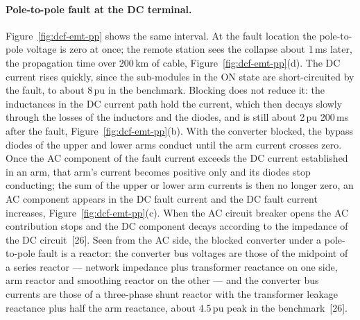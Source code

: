 \paragraph{Pole-to-pole fault at the DC terminal.}
Figure~\ref{fig:dcf-emt-pp} shows the same interval. At the fault location
the pole-to-pole voltage is zero at once; the remote station sees the
collapse about 1\,ms later, the propagation time over 200\,km of cable,
Figure~\ref{fig:dcf-emt-pp}(d). The DC current rises quickly, since the
sub-modules in the ON state are short-circuited by the fault, to about
8\,pu in the benchmark. Blocking does not reduce it: the inductances in the
DC current path hold the current, which then decays slowly through the
losses of the inductors and the diodes, and is still about 2\,pu 200\,ms
after the fault, Figure~\ref{fig:dcf-emt-pp}(b). With the converter blocked,
the bypass diodes of the upper and lower arms conduct until the arm current
crosses zero. Once the AC component of the fault current exceeds the DC
current established in an arm, that arm's current becomes positive only and
its diodes stop conducting; the sum of the upper or lower arm currents is
then no longer zero, an AC component appears in the DC fault current and the
DC fault current increases, Figure~\ref{fig:dcf-emt-pp}(c). When the AC
circuit breaker opens the AC contribution stops and the DC component decays
according to the impedance of the DC circuit~[26]. Seen from the AC side,
the blocked converter under a pole-to-pole fault is a reactor: the converter
bus voltages are those of the midpoint of a series reactor --- network
impedance plus transformer reactance on one side, arm reactor and smoothing
reactor on the other --- and the converter bus currents are those of a
three-phase shunt reactor with the transformer leakage reactance plus half
the arm reactance, about 4.5\,pu peak in the benchmark~[26].

